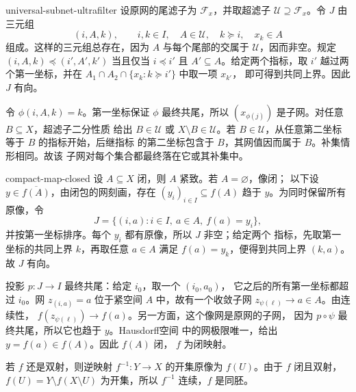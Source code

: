 \begin{solution}{universal-subnet-ultrafilter}
设原网的尾滤子为 \(\mathcal F_x\)，并取超滤子
\(\mathcal U\supseteq\mathcal F_x\)。令 \(J\) 由三元组
\[
 (i,A,k),\qquad i,k\in I,\quad A\in\mathcal U,\quad
 k\succcurlyeq i,\quad x_k\in A
\]
组成。这样的三元组总存在，因为 \(A\) 与每个尾部的交属于
\(\mathcal U\)，因而非空。规定
\((i,A,k)\preccurlyeq(i',A',k')\) 当且仅当
\(i\preccurlyeq i'\) 且 \(A'\subseteq A\)。给定两个指标，取
\(i'\) 越过两个第一坐标，并在
\(A_1\cap A_2\cap\{x_k:k\succcurlyeq i'\}\) 中取一项 \(x_{k'}\)，
即可得到共同上界。因此 \(J\) 有向。

令 \(\phi(i,A,k)=k\)。第一坐标保证 \(\phi\) 最终共尾，所以
\((x_{\phi(j)})\) 是子网。对任意 \(B\subseteq X\)，超滤子二分性质
给出 \(B\in\mathcal U\) 或 \(X\setminus B\in\mathcal U\)。若
\(B\in\mathcal U\)，从任意第二坐标等于 \(B\) 的指标开始，后继指标
的第二坐标包含于 \(B\)，其网值因而属于 \(B\)。补集情形相同。故该
子网对每个集合都最终落在它或其补集中。
\end{solution}

\begin{solution}{compact-map-closed}
设 \(A\subseteq X\) 闭，则 \(A\) 紧致。若 \(A=\varnothing\)，像闭；
以下设 \(y\in\overline{f(A)}\)，由闭包的网刻画，存在
\((y_i)_{i\in I}\subseteq f(A)\) 趋于 \(y\)。为同时保留所有原像，令
\[
 J=\{(i,a):i\in I,\ a\in A,\ f(a)=y_i\},
\]
并按第一坐标排序。每个 \(y_i\) 都有原像，所以 \(J\) 非空；给定两个
指标，先取第一坐标的共同上界 \(k\)，再取任意 \(a\in A\) 满足
\(f(a)=y_k\)，便得到共同上界 \((k,a)\)。故 \(J\) 有向。

投影 \(p:J\to I\) 最终共尾：给定 \(i_0\)，取一个 \((i_0,a_0)\)，
它之后的所有第一坐标都超过 \(i_0\)。网 \(z_{(i,a)}=a\) 位于紧空间
\(A\) 中，故有一个收敛子网 \(z_{\psi(\ell)}\to a\in A\)。由连续性，
\(f(z_{\psi(\ell)})\to f(a)\)。另一方面，这个像网是原网的子网，
因为 \(p\circ\psi\) 最终共尾，所以它也趋于 \(y\)。Hausdorff空间
中的网极限唯一，给出 \(y=f(a)\in f(A)\)。因此 \(f(A)\) 闭，
\(f\) 为闭映射。

若 \(f\) 还是双射，则逆映射 \(f^{-1}:Y\to X\) 的开集原像为
\(f(U)\)。由于 \(f\) 闭且双射，\(f(U)=Y\setminus f(X\setminus U)\)
为开集，所以 \(f^{-1}\) 连续，\(f\) 是同胚。
\end{solution}
